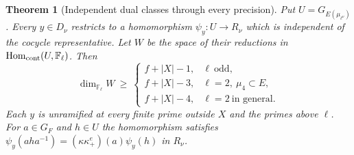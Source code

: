 \documentclass[a4paper,11pt]{article}
\newtheorem{theorem}[proposition]{Theorem}
\theoremstyle{definition}
\theoremstyle{remark}
\numberwithin{equation}{section}
\begin{document}
\begin{theorem}[Independent dual classes through every precision]
\leavevmode\label{thm:dualrelations712}
Put \(U=G_{E(\mu_{\ell^\nu})}\). Every \(y\in D_\nu\)
restricts to a homomorphism \(\psi_y:U\longrightarrow R_\nu\)
which is independent of the cocycle representative. Let \(W\)
be the space of their reductions in
\(\operatorname{Hom}_{\rm cont}(U,\mathbb F_\ell)\). Then
\[
 \dim_{\mathbb F_\ell}W\ \ge\
 \begin{cases}
 f+|X|-1,&\ell\ \text{odd},\\
 f+|X|-3,&\ell=2,\ \mu_4\subset E,\\
 f+|X|-4,&\ell=2\ \text{in general}.
 \end{cases}
\]
Each \(y\) is unramified at every finite prime outside
\(X\) and the primes above \(\ell\).
For \(a\in G_F\) and \(h\in U\) the homomorphism satisfies
\(\psi_y(aha^{-1})=(\kappa\kappa_+^e)(a)\psi_y(h)\) in \(R_\nu\).
\end{theorem}
\end{document}
